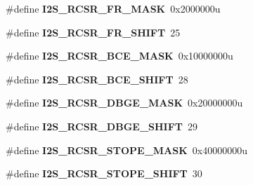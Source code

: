 \begin{DoxyCompactItemize}
\item 
\hypertarget{group___i2_s___register___masks_ga33b3d3641e9acb08f9c001d655f22de7}{}\#define {\bfseries I2\+S\+\_\+\+R\+C\+S\+R\+\_\+\+F\+R\+\_\+\+M\+A\+S\+K}~0x2000000u\label{group___i2_s___register___masks_ga33b3d3641e9acb08f9c001d655f22de7}

\item 
\hypertarget{group___i2_s___register___masks_gafee534215dedadf1826ad34193850dca}{}\#define {\bfseries I2\+S\+\_\+\+R\+C\+S\+R\+\_\+\+F\+R\+\_\+\+S\+H\+I\+F\+T}~25\label{group___i2_s___register___masks_gafee534215dedadf1826ad34193850dca}

\item 
\hypertarget{group___i2_s___register___masks_ga54ae667249649209bb97b5bbbc5fd782}{}\#define {\bfseries I2\+S\+\_\+\+R\+C\+S\+R\+\_\+\+B\+C\+E\+\_\+\+M\+A\+S\+K}~0x10000000u\label{group___i2_s___register___masks_ga54ae667249649209bb97b5bbbc5fd782}

\item 
\hypertarget{group___i2_s___register___masks_ga6db23fcadacc96fdf65ce93ff944c40d}{}\#define {\bfseries I2\+S\+\_\+\+R\+C\+S\+R\+\_\+\+B\+C\+E\+\_\+\+S\+H\+I\+F\+T}~28\label{group___i2_s___register___masks_ga6db23fcadacc96fdf65ce93ff944c40d}

\item 
\hypertarget{group___i2_s___register___masks_ga3b612d1b86edf89a8e6c3bfb5a8bce4e}{}\#define {\bfseries I2\+S\+\_\+\+R\+C\+S\+R\+\_\+\+D\+B\+G\+E\+\_\+\+M\+A\+S\+K}~0x20000000u\label{group___i2_s___register___masks_ga3b612d1b86edf89a8e6c3bfb5a8bce4e}

\item 
\hypertarget{group___i2_s___register___masks_ga631cd411a0272dfbd2cf89390a60ae98}{}\#define {\bfseries I2\+S\+\_\+\+R\+C\+S\+R\+\_\+\+D\+B\+G\+E\+\_\+\+S\+H\+I\+F\+T}~29\label{group___i2_s___register___masks_ga631cd411a0272dfbd2cf89390a60ae98}

\item 
\hypertarget{group___i2_s___register___masks_ga44e7cececc92de704481e691cf2d07da}{}\#define {\bfseries I2\+S\+\_\+\+R\+C\+S\+R\+\_\+\+S\+T\+O\+P\+E\+\_\+\+M\+A\+S\+K}~0x40000000u\label{group___i2_s___register___masks_ga44e7cececc92de704481e691cf2d07da}

\item 
\hypertarget{group___i2_s___register___masks_ga6bb5b025ffa2d2916eec0a3fc9a973aa}{}\#define {\bfseries I2\+S\+\_\+\+R\+C\+S\+R\+\_\+\+S\+T\+O\+P\+E\+\_\+\+S\+H\+I\+F\+T}~30\label{group___i2_s___register___masks_ga6bb5b025ffa2d2916eec0a3fc9a973aa}


\end{DoxyCompactItemize}
